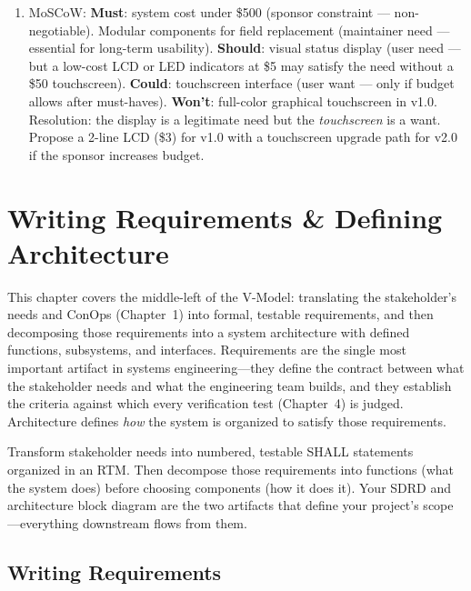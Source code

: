 \documentclass[11pt,letterpaper,twoside,openany]{book}
\begin{document}
\begin{enumerate}[leftmargin=1.5em]
\item MoSCoW: \textbf{Must}: system cost under \$500 (sponsor constraint --- non-negotiable). Modular components for field replacement (maintainer need --- essential for long-term usability). \textbf{Should}: visual status display (user need --- but a low-cost LCD or LED indicators at \$5 may satisfy the need without a \$50 touchscreen). \textbf{Could}: touchscreen interface (user want --- only if budget allows after must-haves). \textbf{Won't}: full-color graphical touchscreen in v1.0. Resolution: the display is a legitimate need but the \emph{touchscreen} is a want. Propose a 2-line LCD (\$3) for v1.0 with a touchscreen upgrade path for v2.0 if the sponsor increases budget.
\end{enumerate}

\FloatBarrier
\chapter{Writing Requirements \& Defining Architecture}

\vspace{1em}

This chapter covers the middle-left of the V-Model: translating the stakeholder's needs and ConOps (Chapter~1) into formal, testable requirements, and then decomposing those requirements into a system architecture with defined functions, subsystems, and interfaces. Requirements are the single most important artifact in systems engineering---they define the contract between what the stakeholder needs and what the engineering team builds, and they establish the criteria against which every verification test (Chapter~4) is judged. Architecture defines \emph{how} the system is organized to satisfy those requirements.

\begin{keyconceptbox}
Transform stakeholder needs into numbered, testable SHALL statements organized in an RTM. Then decompose those requirements into functions (what the system does) before choosing components (how it does it). Your SDRD and architecture block diagram are the two artifacts that define your project's scope---everything downstream flows from them.
\end{keyconceptbox}

\vspace{1em}

\FloatBarrier
\section{Writing Requirements}
\end{document}
